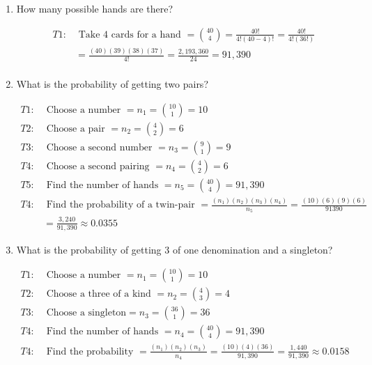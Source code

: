     \begin{enumerate}[label=(\alph*)]
        \item How many possible hands are there?
        
        \begin{mdframed}
            \begin{align*}
                T1: & \text{ Take 4 cards for a hand } = {40 \choose 4} = \frac{40!}{4!(40-4)!} = \frac{40!}{4!(36!)} \\
                & = \frac{(40)(39)(38)(37)}{4!} = \frac{2,193,360}{24} = \boxed{91,390}   \\
            \end{align*}
        \end{mdframed}
    
        \item What is the probability of getting two pairs?
        
        \begin{mdframed}
            \begin{align*}
                T1: & \text{ Choose a number } = n_1 = {10 \choose 1} = 10              \\
                T2: & \text{ Choose a pair } = n_2 = {4 \choose 2} = 6                  \\
                T3: & \text{ Choose a second number } = n_3 = {9 \choose 1} =  9        \\
                T4: & \text{ Choose a second pairing } = n_4 = {4 \choose 2} = 6        \\
                T5: & \text{ Find the number of hands } = n_5 = {40 \choose 4} = 91,390 \\
                T4: & \text{ Find the probability of a twin-pair } = \frac{(n_1)(n_2)(n_3)(n_4)}{n_5} = \frac{(10)(6)(9)(6)}{91390} \\
                &  = \frac{3,240}{91,390} \approx \boxed{0.0355}
            \end{align*}
        \end{mdframed}
    
        \item What is the probability of getting 3 of one denomination and a singleton?
        
        \begin{mdframed}
            \begin{align*}
                T1: & \text{ Choose a number } = n_1 = {10 \choose 1} = 10              \\
                T2: & \text{ Choose a three of a kind } = n_2 = {4 \choose 3} = 4       \\
                T3: & \text{ Choose a singleton} = n_3 = {36 \choose 1} = 36            \\
                T4: & \text{ Find the number of hands } = n_4 = {40 \choose 4} = 91,390 \\
                T4: & \text{ Find the probability } = \frac{(n_1)(n_2)(n_3)}{n_4} = \frac{(10)(4)(36)}{91,390} = \frac{1,440}{91,390} \approx \boxed{0.0158}
            \end{align*}
        \end{mdframed}
    \end{enumerate}


